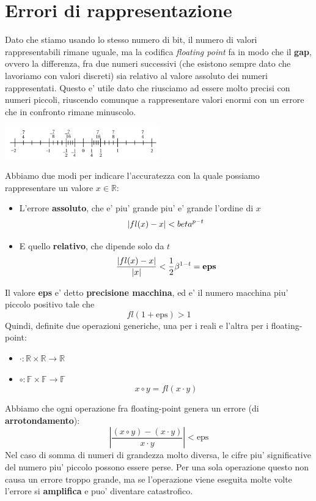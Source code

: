 \documentclass{report}
\begin{document}
\section{Errori di rappresentazione}
Dato che stiamo usando lo stesso numero di bit, il numero di valori rappresentabili rimane uguale, ma la codifica \textit{floating point} fa in modo che il \textbf{gap}, ovvero la differenza, fra due numeri successivi (che esistono sempre dato che lavoriamo con valori discreti) sia relativo al valore assoluto dei numeri rappresentati. Questo e' utile dato che riusciamo ad essere molto precisi con numeri piccoli, riuscendo comunque a rappresentare valori enormi con un errore che in confronto rimane minuscolo. 
\begin{center}
  \includegraphics[width=0.5\textwidth]{img/2024-09-22-16-37-40.png}
\end{center}
Abbiamo due modi per indicare l'accuratezza con la quale possiamo rappresentare un valore $ x \in \mathbb{R} $:
\begin{itemize}
\item L'errore \textbf{assoluto}, che e' piu' grande piu' e' grande l'ordine di $ x $
  \[
    |fl(x)-x|<\\beta^{p-t}
  \]
\item E quello \textbf{relativo}, che dipende solo da $ t $
  \[
    \frac{|fl(x)-x|}{|x|} < \frac{1}{2}\beta^{1-t} = \text{\textbf{eps}}
  \]
\end{itemize}
Il valore \textbf{eps} e' detto \textbf{precisione macchina}, ed e' il numero macchina piu' piccolo positivo tale che
\[
  fl(1+\text{eps}) > 1
\]
Quindi, definite due operazioni generiche, una per i reali e l'altra per i floating-point:
\begin{itemize}
\item $ \cdot: \mathbb{R} \times \mathbb{R} \to \mathbb{R} $
\item $ \circ: \mathbb{F} \times \mathbb{F} \to \mathbb{F} $
  \[
    x \circ y = fl(x \cdot y)
  \]
\end{itemize}
Abbiamo che ogni operazione fra floating-point genera un errore (di \textbf{arrotondamento}):
\[
  \left|\frac{(x \circ y) - (x \cdot y)}{x \cdot y}\right| < \text{eps}
\]  
Nel caso di somma di numeri di grandezza molto diversa, le cifre piu' significative del numero piu' piccolo possono essere perse. Per una sola operazione questo non causa un errore troppo grande, ma se l'operazione viene eseguita molte volte l'errore si \textbf{amplifica} e puo' diventare catastrofico.
\end{document}
